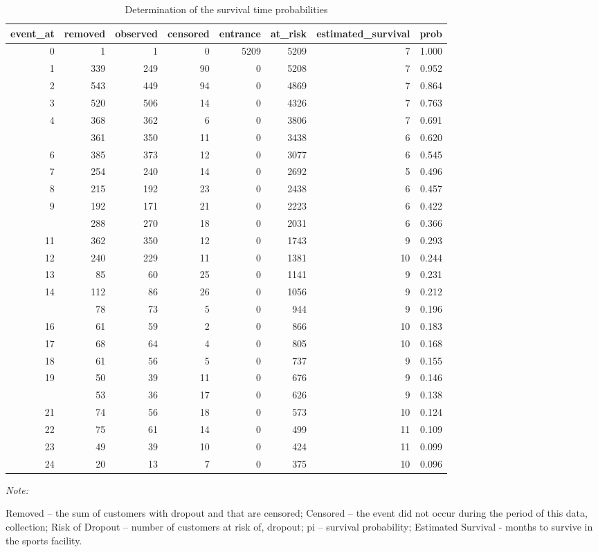 \documentclass[
  12pt,
]{article}
\begin{document}
\begin{table}

\caption{\label{tab:survivalprobabilities}Determination of the survival time probabilities}
\centering
\begin{threeparttable}
\begin{tabular}[t]{rrrrrrrr}
\toprule
event\_at & removed & observed & censored & entrance & at\_risk & estimated\_survival & prob\\
\midrule
0 & 1 & 1 & 0 & 5209 & 5209 & 7 & 1.000\\
1 & 339 & 249 & 90 & 0 & 5208 & 7 & 0.952\\
2 & 543 & 449 & 94 & 0 & 4869 & 7 & 0.864\\
3 & 520 & 506 & 14 & 0 & 4326 & 7 & 0.763\\
4 & 368 & 362 & 6 & 0 & 3806 & 7 & 0.691\\
\addlinespace
5 & 361 & 350 & 11 & 0 & 3438 & 6 & 0.620\\
6 & 385 & 373 & 12 & 0 & 3077 & 6 & 0.545\\
7 & 254 & 240 & 14 & 0 & 2692 & 5 & 0.496\\
8 & 215 & 192 & 23 & 0 & 2438 & 6 & 0.457\\
9 & 192 & 171 & 21 & 0 & 2223 & 6 & 0.422\\
\addlinespace
10 & 288 & 270 & 18 & 0 & 2031 & 6 & 0.366\\
11 & 362 & 350 & 12 & 0 & 1743 & 9 & 0.293\\
12 & 240 & 229 & 11 & 0 & 1381 & 10 & 0.244\\
13 & 85 & 60 & 25 & 0 & 1141 & 9 & 0.231\\
14 & 112 & 86 & 26 & 0 & 1056 & 9 & 0.212\\
\addlinespace
15 & 78 & 73 & 5 & 0 & 944 & 9 & 0.196\\
16 & 61 & 59 & 2 & 0 & 866 & 10 & 0.183\\
17 & 68 & 64 & 4 & 0 & 805 & 10 & 0.168\\
18 & 61 & 56 & 5 & 0 & 737 & 9 & 0.155\\
19 & 50 & 39 & 11 & 0 & 676 & 9 & 0.146\\
\addlinespace
20 & 53 & 36 & 17 & 0 & 626 & 9 & 0.138\\
21 & 74 & 56 & 18 & 0 & 573 & 10 & 0.124\\
22 & 75 & 61 & 14 & 0 & 499 & 11 & 0.109\\
23 & 49 & 39 & 10 & 0 & 424 & 11 & 0.099\\
24 & 20 & 13 & 7 & 0 & 375 & 10 & 0.096\\
\bottomrule
\end{tabular}
\begin{tablenotes}
\item \textit{Note: } 
\item Removed – the sum of customers with dropout and that are censored; Censored – the event did not occur during the period of this data, collection; Risk of Dropout –  number of customers at risk of, dropout; pi – survival probability; Estimated Survival - months to survive in the sports facility.
\end{tablenotes}
\end{threeparttable}
\end{table}
\end{document}
